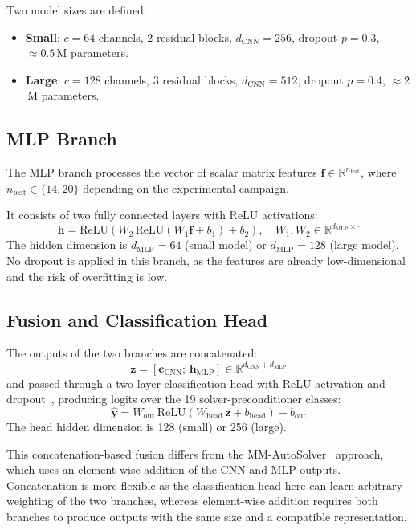 Two model sizes are defined:
\begin{itemize}
  \item \textbf{Small}: $c = 64$ channels, 2 residual blocks, $d_{\text{CNN}} = 256$,
        dropout $p = 0.3$, ${\approx}0.5$\,M parameters.
  \item \textbf{Large}: $c = 128$ channels, 3 residual blocks, $d_{\text{CNN}} = 512$,
        dropout $p = 0.4$, ${\approx}2$\,M parameters.
\end{itemize}

\subsection{MLP Branch}\label{subsec:mlp-branch}

The MLP branch processes the vector of scalar matrix features
$\mathbf{f} \in \mathbb{R}^{n_{\text{feat}}}$, where $n_{\text{feat}} \in \{14, 20\}$
depending on the experimental campaign.

It consists of two fully connected layers with ReLU activations:
\[
  \mathbf{h} = \text{ReLU}(W_2\,\text{ReLU}(W_1 \mathbf{f} + b_1) + b_2),
  \quad W_1, W_2 \in \mathbb{R}^{d_{\text{MLP}} \times \cdot}
\]
The hidden dimension is $d_{\text{MLP}} = 64$ (small model) or $d_{\text{MLP}} = 128$
(large model).
No dropout is applied in this branch, as the features are already low-dimensional and the risk of overfitting is low.

\subsection{Fusion and Classification Head}\label{subsec:fusion}

The outputs of the two branches are concatenated:
\[
  \mathbf{z} = [\mathbf{c}_{\text{CNN}};\, \mathbf{h}_{\text{MLP}}]
  \in \mathbb{R}^{d_{\text{CNN}} + d_{\text{MLP}}}
\]
and passed through a two-layer classification head with ReLU activation and dropout~\cite{srivastava2014dropout},
producing logits over the 19 solver-preconditioner classes:
\[
  \hat{\mathbf{y}} = W_{\text{out}}\,\text{ReLU}(W_{\text{head}}\,\mathbf{z} + b_{\text{head}}) + b_{\text{out}}
\]
The head hidden dimension is 128 (small) or 256 (large).

This concatenation-based fusion differs from the MM-AutoSolver~\cite{xiong2025mmautosolver} approach,
which uses an element-wise addition of the CNN and MLP outputs.
Concatenation is more flexible as the classification head here can learn arbitrary weighting
of the two branches, whereas element-wise addition requires both branches to produce
outputs with the same size and a compatible representation.

